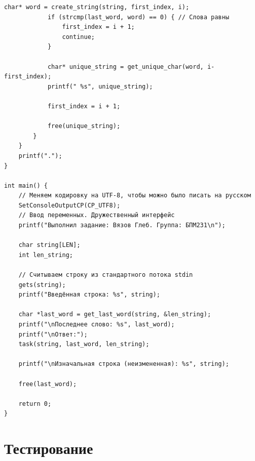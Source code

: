 \documentclass[12pt]{article}
\begin{document}
\begin{lstlisting}[label=string_code1,caption=C]
            char* word = create_string(string, first_index, i);
            if (strcmp(last_word, word) == 0) { // Слова равны
                first_index = i + 1;
                continue;
            }

            char* unique_string = get_unique_char(word, i-first_index);
            printf(" %s", unique_string);

            first_index = i + 1;

            free(unique_string);
        }
    }
    printf(".");
}

int main() {
    // Меняем кодировку на UTF-8, чтобы можно было писать на русском
    SetConsoleOutputCP(CP_UTF8);
    // Ввод переменных. Дружественный интерфейс
    printf("Выполнил задание: Вязов Глеб. Группа: БПМ231\n");

    char string[LEN];
    int len_string;

    // Считываем строку из стандартного потока stdin
    gets(string);
    printf("Введённая строка: %s", string);

    char *last_word = get_last_word(string, &len_string);
    printf("\nПоследнее слово: %s", last_word);
    printf("\nОтвет:");
    task(string, last_word, len_string);

    printf("\nИзначальная строка (неизмененная): %s", string);

    free(last_word);

    return 0;
}
\end{lstlisting} 

\newpage


\section*{Тестирование}
\end{document}
